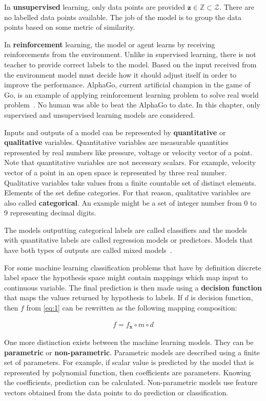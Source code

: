 \documentclass[english, 12pt, a4paper, elec, utf8, online]{aaltothesis}
\begin{document}
In \textbf{unsupervised} learning, only data points are provided $\mathbf{z} \in \mathbb{Z} \subset \mathcal{Z}$. There are no labelled data points available. The job of the model is to group the data points based on some metric of similarity. 


In \textbf{reinforcement} learning, the model or agent learns by receiving reinforcements from the environment. Unlike in supervised learning, there is not teacher to provide correct labels to the model. Based on the input received from the environment model must decide how it should adjust itself in order to improve the performance. AlphaGo, current artificial champion in the game of Go, is an example of applying reinforcement learning problem to solve real world problem~\cite{silver2017mastering}. No human was able to beat the AlphaGo to date. In this chapter, only supervised and unsupervised learning models are considered.     

Inputs and outputs of a model can be represented by \textbf{quantitative} or \textbf{qualitative} variables. Quantitative variables are measurable quantities represented by real numbers like pressure, voltage or velocity vector of a point. Note that quantitative variables are not necessary scalars. For example, velocity vector of a point in an open space is represented by three real number. Qualitative variables take values from a finite countable set of distinct elements. Elements of the set define categories. For that reason, qualitative variables are also called \textbf{categorical}. An example might be a set of integer number from 0 to 9 representing decimal digits. 

The models outputting categorical labels are called classifiers and the models with quantitative labels are called regression models or predictors. Models that have both types of outputs are called mixed models~\cite{Jung2018}. 

For some machine learning classification problems that have by definition discrete label space the hypothesis space might contain mappings which map input to continuous variable. The final prediction is then made using a \textbf{decision function} that maps the values returned by hypothesis to labels. If $d$ is decision function, then $f$ from \ref{eq:1} can be rewritten as the following mapping composition:

\begin{align*}
f = f_{\mathbf{x}} \circ m \circ d
\end{align*}

One more distinction exists between the machine learning models. They can be \textbf{parametric} or \textbf{non-parametric}. Parametric models are described using a finite set of parameters. For example, if scalar value is predicted by the model that is represented by polynomial function, then coefficients are parameters. Knowing the coefficients, prediction can be calculated.  Non-parametric models use feature vectors obtained from the data points to do prediction or classification.  
\end{document}
